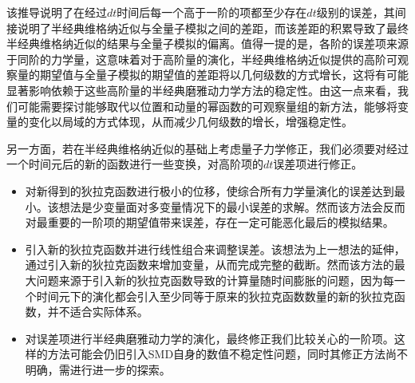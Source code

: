 该推导说明了在经过$dt$时间后每一个高于一阶的项都至少存在$dt$级别的误差，其间接说明了半经典维格纳近似与全量子模拟之间的差距，而该差距的积累导致了最终半经典维格纳近似的结果与全量子模拟的偏离。值得一提的是，各阶的误差项来源于同阶的力学量，这意味着对于高阶量的演化，半经典维格纳近似提供的高阶可观察量的期望值与全量子模拟的期望值的差距将以几何级数的方式增长，这将有可能显著影响依赖于这些高阶量的半经典磨雅动力学方法的稳定性。由这一点来看，我们可能需要探讨能够取代以位置和动量的幂函数的可观察量组的新方法，能够将变量的变化以局域的方式体现，从而减少几何级数的增长，增强稳定性。

另一方面，若在半经典维格纳近似的基础上考虑量子力学修正，我们必须要对经过一个时间元后的新的函数进行一些变换，对高阶项的$dt$误差项进行修正。
\begin{itemize}
	\item 对新得到的狄拉克函数进行极小的位移，使综合所有力学量演化的误差达到最小。该想法是少变量面对多变量情况下的最小误差的求解。然而该方法会反而对最重要的一阶项的期望值带来误差，存在一定可能恶化最后的模拟结果。
	\item 引入新的狄拉克函数并进行线性组合来调整误差。该想法为上一想法的延伸，通过引入新的狄拉克函数来增加变量，从而完成完整的截断。然而该方法的最大问题来源于引入新的狄拉克函数导致的计算量随时间膨胀的问题，因为每一个时间元下的演化都会引入至少同等于原来的狄拉克函数数量的新的狄拉克函数，并不适合实际体系。
	\item 对误差项进行半经典磨雅动力学的演化，最终修正我们比较关心的一阶项。这样的方法可能会仍旧引入SMD自身的数值不稳定性问题，同时其修正方法尚不明确，需进行进一步的探索。
\end{itemize}